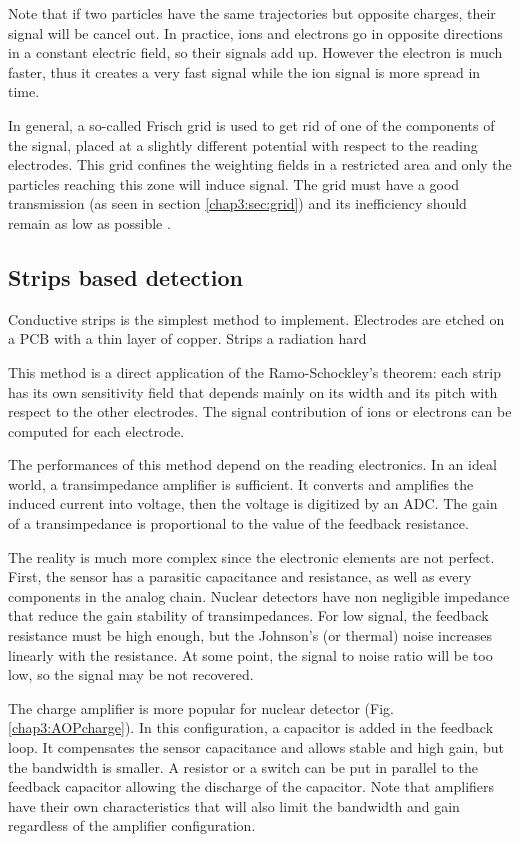\begin{refsection}
  Note that if two particles have the same trajectories but opposite charges, their signal will be cancel out. In practice, ions and electrons go in opposite directions in a constant electric field, so their signals add up. However the electron is much faster, thus it creates a very fast signal while the ion signal is more spread in time.

  In general, a so-called Frisch grid is used to get rid of one of the components of the signal, placed at a slightly different potential with respect to the reading electrodes. This grid confines the weighting fields in a restricted area and only the particles reaching this zone will induce signal. The grid must have a good transmission (as seen in section \ref{chap3:sec:grid}) and its inefficiency should remain as low as possible \cite{Khriachkov1997,Gook2012}.

  \subsection{Strips based detection}
  Conductive strips is the simplest method to implement. Electrodes are etched on a PCB with a thin layer of copper. Strips a radiation hard

  This method is a direct application of the Ramo-Schockley's theorem: each strip has its own sensitivity field that depends mainly on its width and its pitch with respect to the other electrodes. The signal contribution of ions or electrons can be computed for each electrode.

  The performances of this method depend on the reading electronics. In an ideal world, a transimpedance amplifier is sufficient. It converts and amplifies the induced current into voltage, then the voltage is digitized by an ADC. The gain of a transimpedance is proportional to the value of the feedback resistance.

  The reality is much more complex since the electronic elements are not perfect. First, the sensor has a parasitic capacitance and resistance, as well as every components in the analog chain. Nuclear detectors have non negligible impedance that reduce the gain stability of transimpedances.
  For low signal, the feedback resistance must be high enough, but the Johnson’s (or thermal) noise increases linearly with the resistance. At some point, the signal to noise ratio will be too low, so the signal may be not recovered.

  The charge amplifier is more popular for nuclear detector (Fig. \ref{chap3:AOPcharge}). In this configuration, a capacitor is added in the feedback loop. It compensates the sensor capacitance and allows stable and high gain, but the bandwidth is smaller. A resistor or a switch can be put in parallel to the feedback capacitor allowing the discharge of the capacitor. Note that amplifiers have their own characteristics that will also limit the bandwidth and gain regardless of the amplifier configuration.


\end{refsection}
